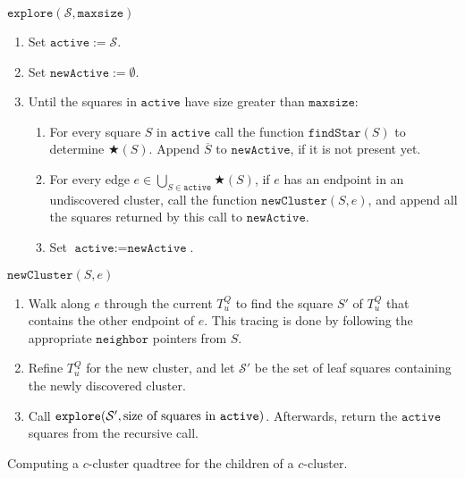 \documentclass[11pt]{paper}
\newcommand {\parent} {\overline}
\begin{document}
\begin{algorithm}
  $\texttt{explore}(\mathcal{S}, \texttt{maxsize})$
  \begin{enumerate}
    \item\label{step:activeS} Set $\texttt{active} := \mathcal{S}$.
    \item Set $\texttt{newActive} := \emptyset$.
    \item\label{step:loop}
          Until the squares in $\texttt{active}$ have size greater than
          $\texttt{maxsize}$:
    \begin{enumerate}
      \item\label{step:activeLoop} For every square $S$ in 
            $\texttt{active}$ call the function $\texttt{findStar}(S)$ 
      to determine $\bigstar(S)$.  Append $\parent S$ to 
      $\texttt{newActive}$, if it is not present yet.
      \item\label{step:starLoop} For every
            edge $e \in \bigcup_{S \in \texttt{active}} \bigstar(S)$,
            if $e$ has an endpoint in an undiscovered cluster,
      call the function $\texttt{newCluster}(S,e)$, and append
      all the squares returned by this call to $\texttt{newActive}$.
      \item \label{step:newActive} Set $\texttt{active} := \texttt{newActive}$.
    \end{enumerate}
  \end{enumerate}
 $\texttt{newCluster}(S,e)$
  \begin{enumerate}
    \item   Walk along $e$  through the current $T_u^Q$ to find the
            square $S'$ of $T_u^Q$ that contains the other endpoint
            of $e$.
            This tracing is done by following the appropriate
            $\texttt{neighbor}$ pointers from $S$.
     \item \label{step:refine} Refine $T_u^Q$ for the new cluster, and
            let $\mathcal{S}'$ be the set of leaf squares containing the newly
            discovered cluster.
      \item Call 
            $\texttt{explore}(\mathcal{S}', 
      \text{size of squares in \texttt{active}})$.
      Afterwards, return the $\texttt{active}$ squares from the recursive call.
  \end{enumerate}
  \caption{Computing a $c$-cluster quadtree for the children of
    a $c$-cluster.}
  \label{alg:explore}
\end{algorithm}
\end{document}
